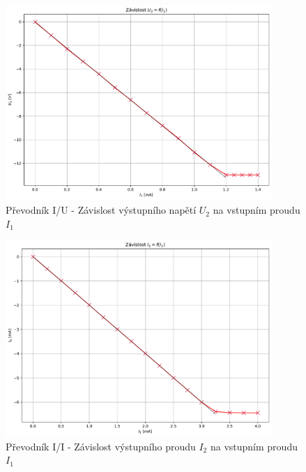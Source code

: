 \documentclass[a4paper, czech]{article}
\begin{document}
\begin{figure}[H]
    \centering
    \includegraphics[width=0.9\textwidth]{grafy/graf_prevodnik_IU.pdf}
    \caption{Převodník I/U - Závislost výstupního napětí $U_2$ na vstupním proudu $I_1$}
\end{figure}

\begin{figure}[H]
    \centering
    \includegraphics[width=0.9\textwidth]{grafy/graf_prevodnik_II.pdf}
    \caption{Převodník I/I - Závislost výstupního proudu $I_2$ na vstupním proudu $I_1$}
\end{figure}
\end{document}
